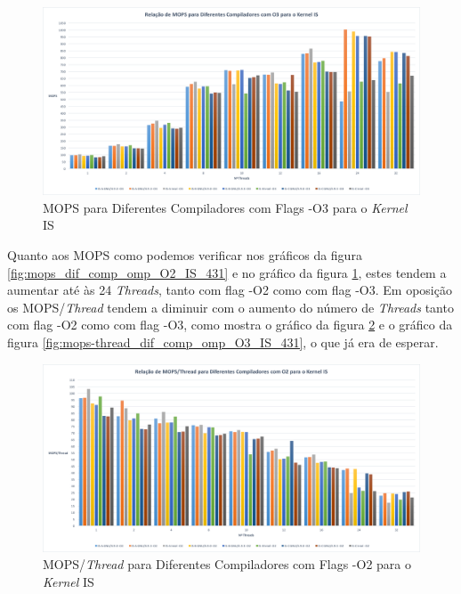 \documentclass[conference,compsoc]{IEEEtran}
\begin{document}
\begin{figure}[h!]
\centering
\includegraphics[scale=0.225]{OMP/mops_dif_comp-O3_IS_nodo-431.png}
\caption{MOPS para Diferentes Compiladores com Flags -O3 para o \textit{Kernel} IS}
\label{fig:mops_dif_comp_omp_O3_IS_431}
\end{figure}

Quanto aos MOPS como podemos verificar nos gráficos da figura \ref{fig:mops_dif_comp_omp_O2_IS_431} e no gráfico da figura \ref{fig:mops_dif_comp_omp_O3_IS_431}, estes tendem a aumentar até às 24 \textit{Threads}, tanto com flag -O2 como com flag -O3. Em oposição os MOPS/\textit{Thread} tendem a diminuir com o aumento do número de \textit{Threads} tanto com flag -O2 como com flag -O3, como mostra o gráfico da figura \ref{fig:mops-thread_dif_comp_omp_O2_IS_431} e o gráfico da figura \ref{fig:mops-thread_dif_comp_omp_O3_IS_431}, o que já era de esperar.

\begin{figure}[h!]
\centering
\includegraphics[scale=0.225]{OMP/mops-thread_dif_comp-O2_IS_nodo-431.png}
\caption{MOPS/\textit{Thread} para Diferentes Compiladores com Flags -O2 para o \textit{Kernel} IS}
\label{fig:mops-thread_dif_comp_omp_O2_IS_431}
\end{figure}
\end{document}
